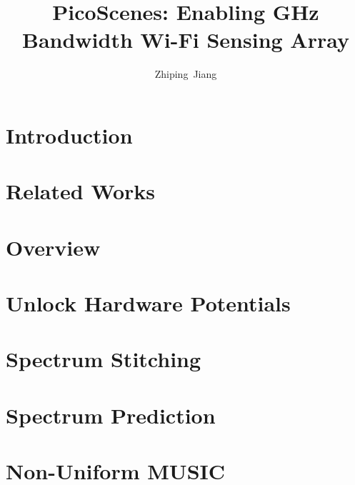 \documentclass{sig-alternate-10pt}
\def\ourprotocol{{PicoScenes}\xspace}
\def\titletext{{\ourprotocol: Enabling GHz Bandwidth Wi-Fi Sensing Array}\xspace}
\begin{document}
\title{\titletext}

\author{Zhiping~Jiang}

\maketitle

\begin{abstract}

\end{abstract}

\section{Introduction} %
\label{sec:introduction}


\section{Related Works} %
\label{sec:related_works}


\section{Overview} %
\label{sec:overview}


\section{Unlock Hardware Potentials} %
\label{sec:unlock_hardware_potentials}


\section{Spectrum Stitching} %
\label{sec:spectrum_stitching}


\section{Spectrum Prediction} %
\label{sec:spectrum_prediction}


\section{Non-Uniform MUSIC} %
\label{sec:non_uniform_music}

\end{document}

